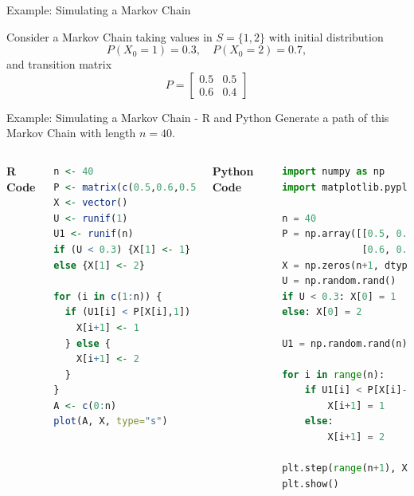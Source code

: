 \documentclass[8pt]{beamer}
\begin{document}
\begin{frame}[fragile]{Example: Simulating a Markov Chain}

Consider a Markov Chain taking values in $S=\{1,2\}$ with initial distribution 
\[
P(X_0=1)=0.3, \quad P(X_0=2)=0.7,
\]
and transition matrix
\[
P = \begin{bmatrix} 
0.5 & 0.5 \\ 
0.6 & 0.4 
\end{bmatrix}
\]
\end{frame}

\begin{frame}[fragile]{Example: Simulating a Markov Chain - R and Python}
Generate a path of this Markov Chain with length $n=40$.

\vspace{2mm}

\begin{columns}[t]
\textbf{R Code}
\begin{lstlisting}[language=R]
n <- 40
P <- matrix(c(0.5,0.6,0.5,0.4),2,2)
X <- vector()
U <- runif(1)
U1 <- runif(n)
if (U < 0.3) {X[1] <- 1} 
else {X[1] <- 2}

for (i in c(1:n)) {
  if (U1[i] < P[X[i],1]) {
    X[i+1] <- 1
  } else {
    X[i+1] <- 2
  }
}
A <- c(0:n)
plot(A, X, type="s")
\end{lstlisting}

\textbf{Python Code}
\begin{lstlisting}[language=Python]
import numpy as np
import matplotlib.pyplot as plt

n = 40
P = np.array([[0.5, 0.5],
              [0.6, 0.4]])
X = np.zeros(n+1, dtype=int)
U = np.random.rand()
if U < 0.3: X[0] = 1
else: X[0] = 2

U1 = np.random.rand(n)

for i in range(n):
    if U1[i] < P[X[i]-1, 0]:
        X[i+1] = 1
    else:
        X[i+1] = 2

plt.step(range(n+1), X)
plt.show()
\end{lstlisting}
\end{columns}
\end{frame}
\end{document}

